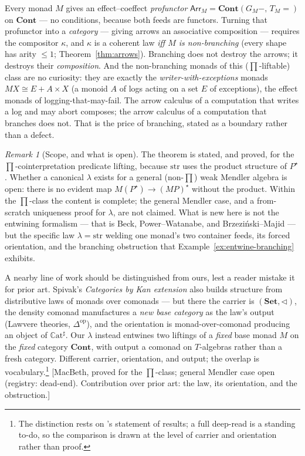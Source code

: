 \documentclass[11pt,a4paper]{book}
\newcommand{\Set}{\mathbf{Set}}
\newcommand{\Cont}{\mathbf{Cont}}
\newcommand{\op}{^{\mathrm{op}}}
\newcommand{\Cathash}{\mathbb{C}\mathrm{at}^\sharp}
\newcommand{\str}{\mathrm{str}}
\newcommand{\Arr}{\mathsf{Arr}}
\theoremstyle{plain}
\theoremstyle{definition}
\theoremstyle{remark}
\newtheorem{Remark}[Theorem]{Remark}
\newcommand{\prov}[1]{\hfill\textsf{\footnotesize[#1]}}
\begin{document}
\begin{teachbox}
Every monad $M$ gives an effect--coeffect \emph{profunctor} $\Arr_{M}=\Cont(G_{M}-,\,T_{M}=)$ on
$\Cont$ --- no conditions, because both feeds are functors. Turning that profunctor into a
\emph{category} --- giving arrows an associative composition --- requires the compositor
$\kappa$, and $\kappa$ is a coherent law \emph{iff $M$ is non-branching} (every shape has arity
$\le 1$; Theorem~\ref{thm:arrows}). Branching does not destroy the arrows; it destroys their
\emph{composition}. And the non-branching monads of this ($\prod$-liftable) class are no
curiosity: they are exactly the \emph{writer-with-exceptions} monads $MX\cong E+A\times X$
(a monoid $A$ of logs acting on a set $E$ of exceptions), the effect monads of
logging-that-may-fail. The arrow calculus of a computation
that writes a log and may abort composes; the arrow calculus of a computation that branches does
not. That is the price of branching, stated as a boundary rather than a defect.
\end{teachbox}

\begin{Remark}[Scope, and what is open]\label{rem:entwine-scope}
The theorem is stated, and proved, for the $\prod$-cointerpretation predicate lifting, because $\str$
uses the product structure of $P^{\star}$. Whether a canonical $\lambda$ exists for a general (non-$\prod$)
weak Mendler algebra is open: there is no evident map $M(P^{\star})\to(M P)^{\star}$ without the product.
Within the $\prod$-class the content is complete; the general Mendler case, and a from-scratch uniqueness
proof for $\lambda$, are not claimed. What is new here is not the entwining formalism --- that is Beck,
Power--Watanabe, and Brzezi\'nski--Majid --- but the specific law $\lambda=\str$ welding one monad's two
container feeds, its forced orientation, and the branching obstruction that Example~\ref{ex:entwine-branching}
exhibits.

A nearby line of work should be distinguished from ours, lest a reader mistake it for prior art. Spivak's
\emph{Categories by Kan extension} \cite{SpivakKanExt} also builds structure from distributive laws of
monads over comonads --- but there the carrier is $(\Set,\triangleleft)$, the density comonad
manufactures a \emph{new base category} as the law's output (Lawvere theories, $\Delta\op$), and the
orientation is monad-over-comonad producing an object of $\Cathash$. Our $\lambda$ instead entwines two
liftings of a \emph{fixed} base monad $M$ on the \emph{fixed} category $\Cont$, with output a comonad on
$T$-algebras rather than a fresh category. Different carrier, orientation, and output; the overlap is
vocabulary.\footnote{The distinction rests on \cite{SpivakKanExt}'s statement of results; a full deep-read
is a standing to-do, so the comparison is drawn at the level of carrier and orientation rather than proof.}
\prov{MacBeth, proved for the $\prod$-class; general Mendler case open (registry: dead-end).
Contribution over prior art: the law, its orientation, and the obstruction.}
\end{Remark}
\end{document}
